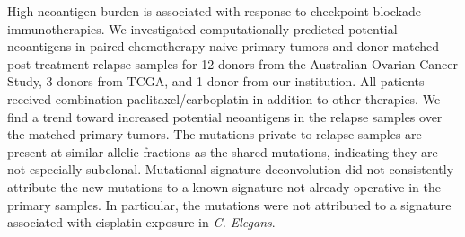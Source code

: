 High neoantigen burden is associated with response to checkpoint blockade immunotherapies. We investigated computationally-predicted potential neoantigens in paired chemotherapy-naive primary tumors and donor-matched post-treatment relapse samples for 12 donors from the Australian Ovarian Cancer Study, 3 donors from TCGA, and 1 donor from our institution. All patients received combination paclitaxel/carboplatin in addition to other therapies. We find a trend toward increased potential neoantigens in the relapse samples over the matched primary tumors. The mutations private to relapse samples are present at similar allelic fractions as the shared mutations, indicating they are not especially subclonal. Mutational signature deconvolution did not consistently attribute the new mutations to a known signature not already operative in the primary samples. In particular, the mutations were not attributed to a signature associated with cisplatin exposure in \textit{C. Elegans}.


